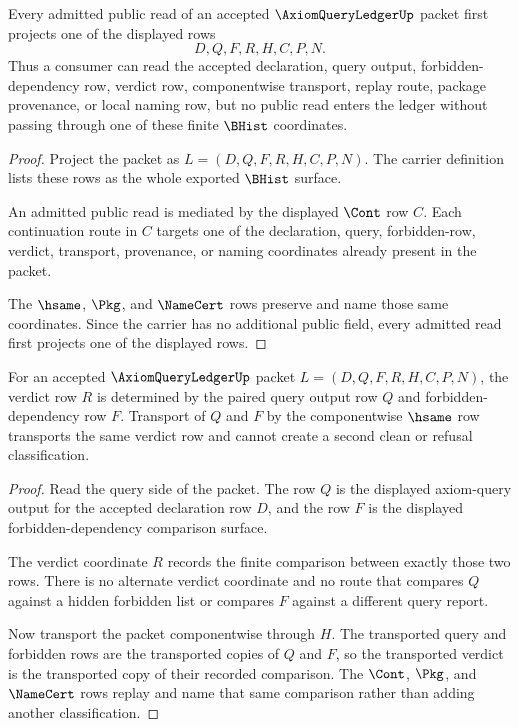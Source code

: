 \begin{theorem}
\label{thm:axiom-query-ledger-carrier-exposure}
Every admitted public read of an accepted $\AxiomQueryLedgerUp$ packet first projects one of the displayed rows
$$
D,Q,F,R,H,C,P,N.
$$
Thus a consumer can read the accepted declaration, query output, forbidden-dependency row, verdict row, componentwise transport, replay route, package provenance, or local naming row, but no public read enters the ledger without passing through one of these finite $\BHist$ coordinates.
\end{theorem}
\begin{proof}
Project the packet as $L=(D,Q,F,R,H,C,P,N)$. The carrier definition lists these rows as the whole exported $\BHist$ surface.

An admitted public read is mediated by the displayed $\Cont$ row $C$. Each continuation route in $C$ targets one of the declaration, query, forbidden-row, verdict, transport, provenance, or naming coordinates already present in the packet.

The $\hsame$, $\Pkg$, and $\NameCert$ rows preserve and name those same coordinates. Since the carrier has no additional public field, every admitted read first projects one of the displayed rows.
\end{proof}

\begin{theorem}
\label{thm:axiom-query-ledger-verdict-determinacy}
For an accepted $\AxiomQueryLedgerUp$ packet $L=(D,Q,F,R,H,C,P,N)$, the verdict row $R$ is determined by the paired query output row $Q$ and forbidden-dependency row $F$. Transport of $Q$ and $F$ by the componentwise $\hsame$ row transports the same verdict row and cannot create a second clean or refusal classification.
\end{theorem}
\begin{proof}
Read the query side of the packet. The row $Q$ is the displayed axiom-query output for the accepted declaration row $D$, and the row $F$ is the displayed forbidden-dependency comparison surface.

The verdict coordinate $R$ records the finite comparison between exactly those two rows. There is no alternate verdict coordinate and no route that compares $Q$ against a hidden forbidden list or compares $F$ against a different query report.

Now transport the packet componentwise through $H$. The transported query and forbidden rows are the transported copies of $Q$ and $F$, so the transported verdict is the transported copy of their recorded comparison. The $\Cont$, $\Pkg$, and $\NameCert$ rows replay and name that same comparison rather than adding another classification.
\end{proof}

